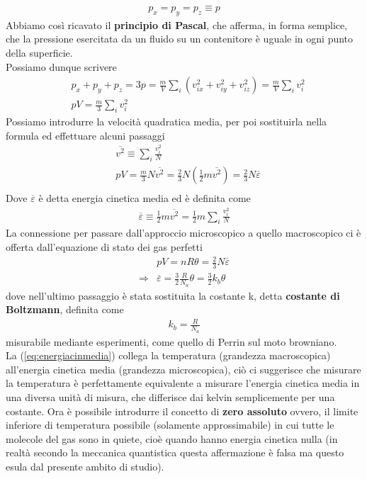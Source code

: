\documentclass[10pt,a4paper]{article}
\begin{document}
\begin{align*} 
	p_x = p_y = p_z \equiv p
\end{align*} 
Abbiamo così ricavato il \textbf{principio di Pascal}, che afferma, in forma semplice, che la pressione esercitata da un fluido su un contenitore è uguale in ogni punto della superficie.\\
Possiamo dunque scrivere
\begin{align*} 
	&p_x+p_y+p_z = 3p = \frac{m}{V} \sum_i (v_{ix}^2+v_{iy}^2+v_{iz}^2) = \frac{m}{V} \sum_i v_i^2\\
	&pV = \frac{m}{3}\sum_i v_i^2
\end{align*} 
Possiamo introdurre la velocità quadratica media, per poi sostituirla nella formula ed effettuare alcuni passaggi
\begin{align*} 
	&\overline{v^2} \equiv \sum_i\frac{v_i^2}{N}\\
	&pV = \frac{m}{3}N \overline{v^2} = \frac{2}{3} N (\frac{1}{2}m \overline{v^2})=\frac{2}{3}N \overline{\varepsilon}\\
\end{align*} 
Dove $\overline{\varepsilon}$ è detta energia cinetica media ed è definita come
\begin{align*} 
	\overline{\varepsilon} \equiv \frac{1}{2} m \overline{v^2} = \frac{1}{2} m \sum_i\frac{v_i^2}{N}
\end{align*} 
La connessione per passare dall'approccio microscopico a quello macroscopico ci è offerta dall'equazione di stato dei gas perfetti
\begin{align}\label{eq:energiacinmedia}
	&pV = n R \theta = \frac{2}{3}N \overline{\varepsilon}\nonumber\\
	\Rightarrow & \overline{\varepsilon} = \frac{3}{2} \frac{R}{N_a} \theta = \frac{3}{2}k_b\theta
\end{align} 
dove nell'ultimo passaggio è stata sostituita la costante k, detta \textbf{costante di Boltzmann}, definita come
\begin{align*} 
k_b = \frac{R}{N_a}
\end{align*} 
misurabile mediante esperimenti, come quello di Perrin sul moto browniano.\\ 
La (\ref{eq:energiacinmedia}) collega la temperatura (grandezza macroscopica) all'energia cinetica media (grandezza microscopica), ciò ci suggerisce che misurare la temperatura è perfettamente equivalente a misurare l'energia cinetica media in una diversa unità di misura, che differisce dai kelvin semplicemente per una costante. Ora è possibile introdurre il concetto di \textbf{zero assoluto} ovvero, il limite inferiore di temperatura possibile (solamente approssimabile) in cui tutte le molecole del gas sono in quiete, cioè quando hanno energia cinetica nulla (in realtà secondo la meccanica quantistica questa affermazione è falsa ma questo esula dal presente ambito di studio).
\end{document}
